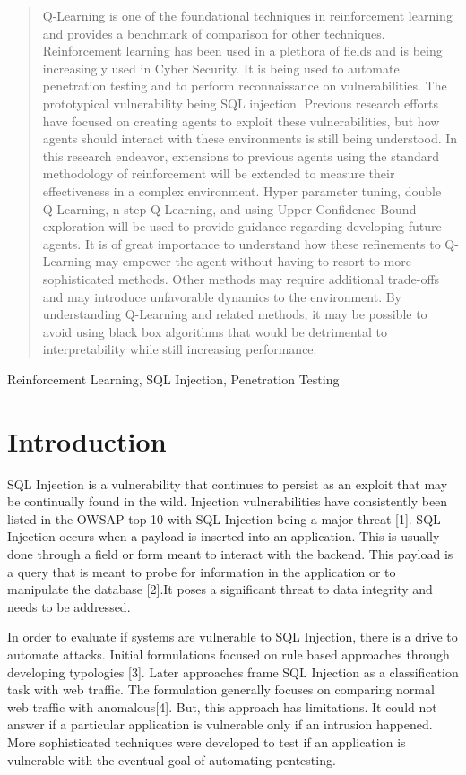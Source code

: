 \documentclass[conference]{IEEEtran}
\begin{document}
\begin{abstract}
Q-Learning is one of the foundational techniques in reinforcement learning and provides a benchmark of comparison for other techniques. Reinforcement learning has been used in a plethora of fields and is being increasingly used in Cyber Security. It is being used to automate penetration testing and to perform reconnaissance on vulnerabilities.  The prototypical vulnerability being SQL injection. Previous research efforts have focused on creating agents to exploit these vulnerabilities, but how agents should interact with these environments is still being understood. In this research endeavor, extensions to previous agents using the standard methodology of reinforcement will be extended to measure their effectiveness in a complex environment. Hyper parameter tuning, double Q-Learning, n-step Q-Learning, and using Upper Confidence Bound exploration will be used to provide guidance regarding developing future agents. It is of great importance to understand how these refinements to Q-Learning may empower the agent without having to resort to more sophisticated methods. Other methods may require additional trade-offs and may introduce unfavorable dynamics to the environment. By understanding Q-Learning and related methods, it may be possible to avoid using black box algorithms that would be detrimental to interpretability while still increasing performance.  
\end{abstract}

\begin{IEEEkeywords}
Reinforcement Learning, SQL Injection, Penetration Testing 
\end{IEEEkeywords}

\section{Introduction}
SQL Injection is a vulnerability that continues to persist as an exploit that may be continually found in the wild. Injection vulnerabilities have consistently been listed in the OWSAP top 10 with SQL Injection being a major threat [1]. SQL Injection occurs when a payload is inserted into an application. This is usually done through a field or form meant to interact with the backend. This payload is a query that is meant to probe for information in the application or to manipulate the database [2].It poses a significant threat to data integrity and needs to be  addressed. 

In order to evaluate if systems are vulnerable to SQL Injection, there is a drive to automate attacks. Initial formulations focused on rule based approaches through developing typologies [3]. Later approaches frame SQL Injection as a classification task with web traffic. The formulation generally  focuses on comparing normal web traffic with anomalous[4]. But, this approach has limitations. It could not answer if a particular application is vulnerable only if an intrusion happened. More sophisticated techniques were developed to test if an application is vulnerable with the eventual goal of automating pentesting.   
\end{document}
